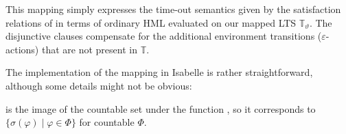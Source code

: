 \begin{isabellebody}
\begin{isamarkuptext}
This mapping simply expresses the time-out semantics given by the satisfaction relations of \HMLt{} in terms of ordinary HML evaluated on our mapped LTS $\mathbb{T}_\vartheta$. The disjunctive clauses compensate for the additional environment transitions ($\varepsilon$-actions) that are not present in $\mathbb{T}$.%
\end{isamarkuptext}\isamarkuptrue%
%
\isadelimdocument
%
\endisadelimdocument
%
\isatagdocument
%
\isamarkuptrue%
%
\endisatagdocument
{\isafolddocument}%
%
\isadelimdocument
%
\endisadelimdocument
%
\begin{isamarkuptext}%
The implementation of the mapping in Isabelle is rather straightforward, although some details might not be obvious: 

 is the image of the countable set \isa{{\isasymPhi}} under the function \isa{{\isasymlambda}\ {\isasymphi}{\isachardot}{\kern0pt}\ {\isasymsigma}{\isacharparenleft}{\kern0pt}{\isasymphi}{\isacharparenright}{\kern0pt}}, so it corresponds to $\{ \sigma(\varphi) \mid \varphi \in \Phi \}$ for countable $\Phi$.


\end{isamarkuptext}
\end{isabellebody}
